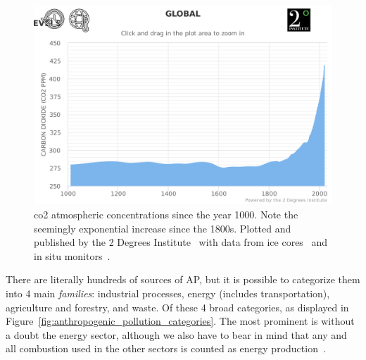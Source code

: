 \begin{figure}[htpb]
    \centering
    \includegraphics[clip, %
                     trim=0cm 1cm 0cm 4.5cm,%
                     width=0.8\linewidth]{img/pdf/co2_ice_cores.pdf}
                     \caption{\gls{co2} atmospheric concentrations since
                         the year 1000. Note the seemingly exponential
                         increase since the 1800s. Plotted and published
                         by the 2 Degrees Institute~\cite{co2levels2020}
                         with data from ice cores~\cite{Etheridge} and
                         in situ monitors~\cite{Tans}.}
    \label{fig:co2_concentration}
\end{figure}

There are literally hundreds of sources of \gls{AP}, but it is possible
to categorize them into 4 main \emph{families}: industrial processes,
energy (includes transportation), agriculture and forestry, and waste.
Of these 4 broad categories, as displayed in
Figure~\ref{fig:anthropogenic_pollution_categories}. The most prominent
is without a doubt the energy sector, although we also have to bear in
mind that any and all combustion used in the other sectors is counted as
energy production~\cite{InternationalAgencyforResearchonCancer2016,
CABI2019}.

